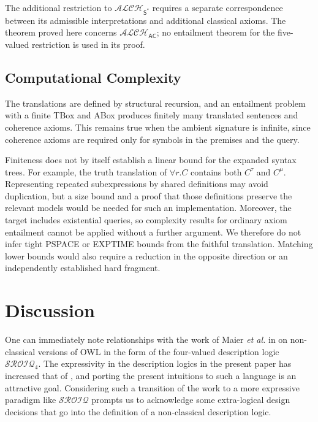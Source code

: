 \documentclass[letterpaper]{article} %
\theoremstyle{definition}
\theoremstyle{definition}
\theoremstyle{definition}
\theoremstyle{definition}
\theoremstyle{definition}
\begin{document}
The additional restriction to $\mathcal{ALCH}_{\mathsf{S}^*}$ requires a separate correspondence between its admissible interpretations and additional classical axioms. The theorem proved here concerns $\mathcal{ALCH}_{\mathsf{AC}}$; no entailment theorem for the five-valued restriction is used in its proof.

\subsection{Computational Complexity}

The translations are defined by structural recursion, and an entailment problem with a finite TBox and ABox produces finitely many translated sentences and coherence axioms. This remains true when the ambient signature is infinite, since coherence axioms are required only for symbols in the premises and the query.

Finiteness does not by itself establish a linear bound for the expanded syntax trees. For example, the truth translation of $\forall r.C$ contains both $C^{\tau}$ and $C^{\mu}$. Representing repeated subexpressions by shared definitions may avoid duplication, but a size bound and a proof that those definitions preserve the relevant models would be needed for such an implementation. Moreover, the target includes existential queries, so complexity results for ordinary axiom entailment cannot be applied without a further argument. We therefore do not infer tight \textsf{PSPACE} or \textsf{EXPTIME} bounds from the faithful translation. Matching lower bounds would also require a reduction in the opposite direction or an independently established hard fragment.

\section{Discussion}

One can immediately note relationships with the work of Maier \emph{et al.} in \cite{DBLP:journals/semweb/MaierMH13} on non-classical versions of OWL in the form of the four-valued description logic $\mathcal{SROIQ}_{4}$. The expressivity in the description logics in the present paper has increased that of \cite{DBLP:conf/dlog/Ferguson21}, and porting the present intuitions to such a language is an attractive goal. Considering such a transition of the work to a more expressive paradigm like $\mathcal{SROIQ}$ prompts us to acknowledge some extra-logical design decisions that go into the definition of a non-classical description logic.
\end{document}
